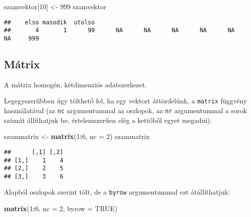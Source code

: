 \documentclass[]{book}
\newenvironment{Shaded}{\begin{snugshade}}{\end{snugshade}}
\newcommand{\DataTypeTok}[1]{\textcolor[rgb]{0.13,0.29,0.53}{#1}}
\newcommand{\DecValTok}[1]{\textcolor[rgb]{0.00,0.00,0.81}{#1}}
\newcommand{\KeywordTok}[1]{\textcolor[rgb]{0.13,0.29,0.53}{\textbf{#1}}}
\newcommand{\NormalTok}[1]{#1}
\newcommand{\OperatorTok}[1]{\textcolor[rgb]{0.81,0.36,0.00}{\textbf{#1}}}
\newcommand{\OtherTok}[1]{\textcolor[rgb]{0.56,0.35,0.01}{#1}}
\newcommand{\StringTok}[1]{\textcolor[rgb]{0.31,0.60,0.02}{#1}}
\begin{document}
\begin{Shaded}
\begin{Highlighting}[]
\NormalTok{szamvektor[}\DecValTok{10}\NormalTok{] <-}\StringTok{ }\DecValTok{999}
\NormalTok{szamvektor}
\end{Highlighting}
\end{Shaded}

\begin{verbatim}
##    elso masodik  utolso                                                         
##       4       1      99      NA      NA      NA      NA      NA      NA     999
\end{verbatim}

\hypertarget{muxe1trix}{%
\subsection{Mátrix}\label{muxe1trix}}

A mátrix homogén, kétdimenziós adatszerkezet.

Legegyszerűbben úgy tölthető fel, ha egy vektort áttördelünk, a \texttt{matrix} függvény használatával (az \texttt{nc} argumentummal az oszlopok, az \texttt{nr} argumentummal a sorok számát állíthatjuk be, értelemszerűen elég a kettőből egyet megadni):

\begin{Shaded}
\begin{Highlighting}[]
\NormalTok{szammatrix <-}\StringTok{ }\KeywordTok{matrix}\NormalTok{(}\DecValTok{1}\OperatorTok{:}\DecValTok{6}\NormalTok{, }\DataTypeTok{nc =} \DecValTok{2}\NormalTok{)}
\NormalTok{szammatrix}
\end{Highlighting}
\end{Shaded}

\begin{verbatim}
##      [,1] [,2]
## [1,]    1    4
## [2,]    2    5
## [3,]    3    6
\end{verbatim}

Alapból oszlopok szerint tölt, de a \texttt{byrow} argumentummal ezt átállíthatjuk:

\begin{Shaded}
\begin{Highlighting}[]
\KeywordTok{matrix}\NormalTok{(}\DecValTok{1}\OperatorTok{:}\DecValTok{6}\NormalTok{, }\DataTypeTok{nc =} \DecValTok{2}\NormalTok{, }\DataTypeTok{byrow =} \OtherTok{TRUE}\NormalTok{)}
\end{Highlighting}
\end{Shaded}
\end{document}
